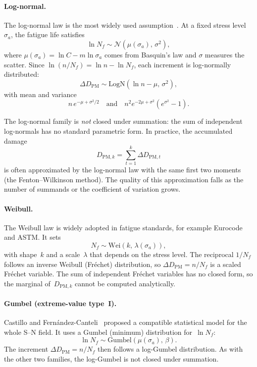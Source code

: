 \documentclass[11pt,a4paper]{article}
\theoremstyle{plain}
\theoremstyle{definition}
\theoremstyle{remark}
\begin{document}
\paragraph{Log-normal.}
The log-normal law is the most widely used assumption~\cite{MunizCalvente2022}.
At a fixed stress level~$\sigma_a$, the fatigue life satisfies
\begin{equation}
  \ln N_f \sim \mathcal{N}(\mu(\sigma_a),\,\sigma^2),
\end{equation}
where $\mu(\sigma_a) = \ln C - m\ln\sigma_a$ comes from Basquin's law and $\sigma$ measures the scatter.
Since $\ln(n/N_f) = \ln n - \ln N_f$, each increment is log-normally distributed:
\begin{equation}
  \Delta D_{\mathrm{PM}} \sim \mathrm{LogN}(\ln n - \mu,\,\sigma^2),
\end{equation}
with mean and variance
\begin{equation}
  n\,e^{-\mu + \sigma^2/2}
  \quad\text{and}\quad
  n^2 e^{-2\mu+\sigma^2}(e^{\sigma^2}-1).
\end{equation}

The log-normal family is \emph{not} closed under summation: the sum of independent log-normals has no standard parametric form.
In practice, the accumulated damage
\begin{equation}
  D_{\mathrm{PM},k} = \sum_{t=1}^{k}\Delta D_{\mathrm{PM},t}
\end{equation}
is often approximated by the log-normal law with the same first two moments (the Fenton--Wilkinson method).
The quality of this approximation falls as the number of summands or the coefficient of variation grows.

\paragraph{Weibull.}
The Weibull law is widely adopted in fatigue standards, for example Eurocode and ASTM.
It sets
\begin{equation}
  N_f \sim \mathrm{Wei}(k,\,\lambda(\sigma_a)),
\end{equation}
with shape~$k$ and a scale~$\lambda$ that depends on the stress level.
The reciprocal $1/N_f$ follows an inverse Weibull (Fr\'echet) distribution, so $\Delta D_{\mathrm{PM}} = n/N_f$ is a scaled Fr\'echet variable.
The sum of independent Fr\'echet variables has no closed form, so the marginal of~$D_{\mathrm{PM},k}$ cannot be computed analytically.

\paragraph{Gumbel (extreme-value type~I).}
Castillo and Fern\'andez-Canteli~\cite{CastilloFernandezCanteli2009} proposed a compatible statistical model for the whole S--N field.
It uses a Gumbel (minimum) distribution for~$\ln N_f$:
\begin{equation}
  \ln N_f \sim \mathrm{Gumbel}(\mu(\sigma_a),\,\beta).
\end{equation}
The increment $\Delta D_{\mathrm{PM}} = n/N_f$ then follows a log-Gumbel distribution.
As with the other two families, the log-Gumbel is not closed under summation.
\end{document}
